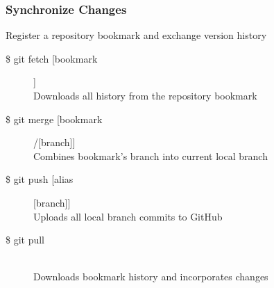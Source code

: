 \subsubsection{Synchronize Changes}
Register a repository bookmark and exchange version history

\begin{description}

\item [\$ git fetch [bookmark]]\\
Downloads all history from the repository bookmark

\item [\$ git merge [bookmark]/[branch]]\\
Combines bookmark’s branch into current local branch

\item [\$ git push [alias][branch]]\\
Uploads all local branch commits to GitHub

\item [\$ git pull] \leavevmode \\
Downloads bookmark history and incorporates changes

\end{description}
